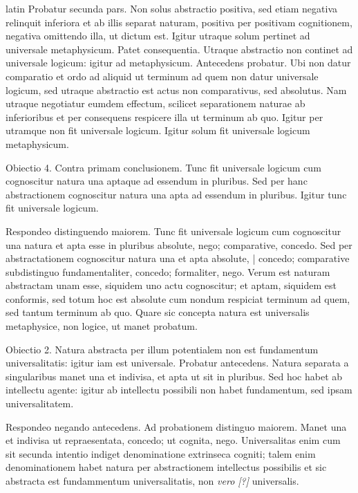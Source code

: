 \begin{otherlanguage*}{latin}
\pstart
Probatur secunda pars. Non solus abstractio positiva, sed etiam negativa relinquit inferiora et ab illis separat naturam, positiva per positivam cognitionem, negativa omittendo illa, ut dictum est. Igitur utraque solum pertinet ad universale metaphysicum. Patet consequentia. Utraque abstractio non continet ad universale logicum:
igitur ad metaphysicum. Antecedens probatur. Ubi non datur comparatio et ordo ad aliquid ut terminum ad quem non datur universale logicum, sed utraque abstractio est actus non comparativus, sed absolutus. Nam utraque negotiatur eumdem effectum, scilicet separationem naturae ab inferioribus et per consequens respicere illa ut terminum ab quo. Igitur per utramque non fit universale logicum. Igitur solum fit universale logicum metaphysicum. 
\pend

\pstart
Obiectio 4. Contra primam conclusionem. Tunc fit universale logicum cum cognoscitur natura una aptaque ad essendum in pluribus. Sed per hanc abstractionem cognoscitur natura una apta ad essendum in pluribus. Igitur tunc fit universale logicum. 
\pend

\pstart
Respondeo distinguendo maiorem. Tunc fit universale logicum cum cognoscitur una natura et apta esse in pluribus absolute, nego; comparative, concedo. Sed per abstractationem cognoscitur natura una et apta absolute, \textnormal{|} concedo; comparative subdistinguo fundamentaliter, concedo; formaliter, nego. Verum est naturam abstractam unam esse, siquidem uno actu cognoscitur; et aptam, siquidem est conformis, sed totum hoc est absolute cum nondum respiciat terminum ad quem, sed tantum terminum ab quo. Quare sic concepta natura est universalis metaphysice, non logice, ut manet probatum. 
\pend

\pstart
Obiectio 2. Natura abstracta per illum potentialem non est fundamentum universalitatis:
igitur iam est universale. Probatur antecedens. Natura separata a singularibus manet una et indivisa, et apta ut sit in pluribus. Sed hoc habet ab intellectu agente:
igitur ab intellectu possibili non habet fundamentum, sed ipsam universalitatem. 
\pend

\pstart
Respondeo negando antecedens. Ad probationem distinguo maiorem. Manet una et indivisa ut repraesentata, concedo; ut cognita, nego. Universalitas enim cum sit secunda intentio indiget denominatione extrinseca cogniti; talem enim denominationem habet natura per abstractionem intellectus possibilis et sic abstracta est fundammentum universalitatis, non \emph{vero [?]} universalis. 
\pend


\end{otherlanguage*}
